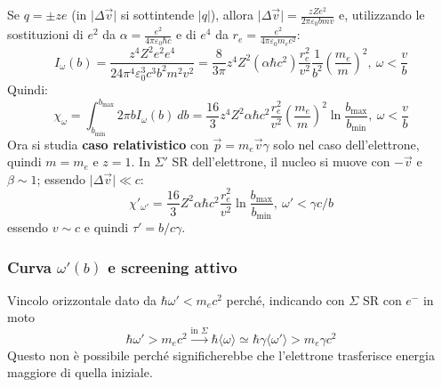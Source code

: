 \documentclass[10pt, a4paper]{scrartcl}
\numberwithin{equation}{subsection}
\theoremstyle{style1}
\begin{document}
Se $q = \pm ze$ (in $\lvert \Delta \vec{v} \rvert$ si sottintende $|q|$), allora $\lvert \Delta \vec{v} \rvert = \frac{zZe^2}{2\pi \varepsilon _0 bmv}$ e, utilizzando le sostituzioni di $e^2$ da $\alpha  = \frac{e^2}{4\pi \varepsilon _0 \hbar  c}$ e di $e^4$ da $r_e = \frac{e^2}{4\pi \varepsilon _0 m_e c^2}$:
\begin{equation}
	I_\omega (b) = \frac{z^4 Z^2 e^2 e^4}{24 \pi^4 \varepsilon _0^3 c^3 b^2 m^2 v^2} = \frac{8}{3\pi} z^4 Z^2 (\alpha \hbar c^2) \frac{r_e^2}{v^2} \frac{1}{b^2} \left(\frac{m_e}{m}\right) ^2 , \ \omega < \frac{v}{b}
\end{equation}
Quindi:
\begin{equation}
	\chi _\omega = \int_{b_\text{min}}^{b_\text{max}} 2\pi b I_\omega(b) \ db = \frac{16}{3} z^4 Z^2 \alpha \hbar c^2 \frac{r_e^2}{v^2} \left(\frac{m_e}{m}\right) ^2 \ln \frac{b_\text{max}}{b_\text{min}} , \ \omega < \frac{v}{b}
\end{equation}
Ora si studia \textbf{caso relativistico} con $\vec{p} = m_e \vec{v}\gamma$ solo nel caso dell'elettrone, quindi $m=m_e$ e $z=1$. In $\Sigma'$ SR dell'elettrone, il nucleo si muove con $-\vec{v}$ e $\beta \sim 1$; essendo $\lvert \Delta \vec{v} \rvert  \ll c$:
\[
\chi '_{\omega'} = \frac{16}{3} Z^2 \alpha  \hbar  c^2 \frac{r_e^2}{v^2} \ln \frac{b_\text{max}}{b_\text{min}}, \ \omega' < \gamma c / b
\] 
essendo $v \sim c$ e quindi $\tau ' = b / c\gamma$. 

\subsubsection{Curva $\omega'(b)$ e screening attivo}
Vincolo orizzontale dato da $\hbar \omega ' < m_ec^2$ perch\'e, indicando con $\Sigma$ SR con $e^-$ in moto
\[
	\hbar  \omega ' > m_e c^2 \stackrel{\text{in } \Sigma}{\longrightarrow} \hbar \langle \omega \rangle \simeq \hbar \gamma \langle \omega' \rangle > m_e  \gamma c^2
\] 
Questo non \`e possibile perch\'e significherebbe che l'elettrone trasferisce energia maggiore di quella iniziale. 
\end{document}
